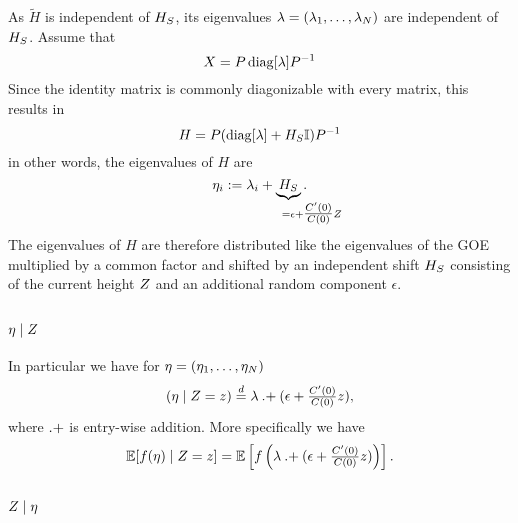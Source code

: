 As \(\tilde{H}\) is independent of \(H_S\), its eigenvalues
\(\lambda=(\lambda_1,\dots,\lambda_N)\) are independent of
\(H_S\). Assume that
\[
	X = P\operatorname{diag}[\lambda]P^{-1}
\]
Since the identity matrix is commonly diagonizable with every matrix, this
results in
\[
	H = P(\operatorname{diag}[\lambda] + H_S\mathbb{I}) P^{-1}
\]
in other words, the eigenvalues of \(H\) are
\[
	\evH_i
	:= \evGOE_i + \underbrace{\shift}_{=\epsilon \mathrlap{+ \tfrac{\sqC'(0)}{\sqC(0)}\rf}}.
\]
The eigenvalues of \(H\) are therefore distributed like the eigenvalues of the
GOE multiplied by a common factor and shifted by an independent shift \(H_S\)
consisting of the current height \(Z\) and an additional random component
\(\epsilon\).

\subsection{\texorpdfstring{\(\eta\mid Z\)}{Λ|Z}}
\label{subsec: Lambda|rf}

In particular we have for \(\eta = (\eta_1,\dots,\eta_N)\)
\[
	(\eta \mid Z = z)
	\overset{d}= 
	\lambda \mathbin{.+} (\epsilon + \tfrac{C'(0)}{C(0)}z),
\]
where \(\mathbin{.+}\) is entry-wise addition.
More specifically we have
\begin{equation}\label{eq: expectation f(Lambda) | Z}
		\mathbb{E}[f(\eta)\mid Z=z]
		= \mathbb{E}\left[
			f\left(\lambda \mathbin{.+} (\epsilon+\tfrac{C'(0)}{C(0)}z)\right)
		\right].
\end{equation}

\subsection{\texorpdfstring{\(Z\mid\eta\)}{Z|Λ}}

